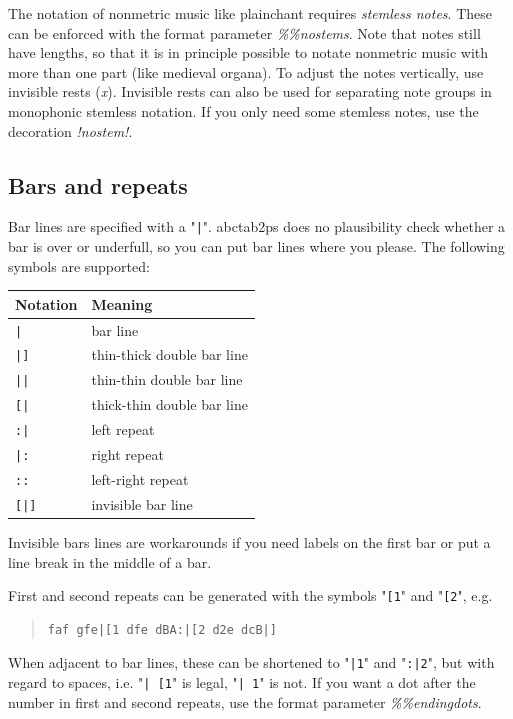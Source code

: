 \documentclass[a4paper]{article}
\begin{document}
 
The notation of nonmetric music like plainchant requires {\it stemless notes}.
These can be enforced with the format parameter {\it \%\%nostems}.
Note that notes still have lengths, so that it is in principle possible
to notate nonmetric music with more than one part (like medieval organa).
To adjust the notes vertically, use invisible rests ({\it x}). Invisible
rests can also be used for separating note groups in monophonic stemless
notation. If you only need some stemless notes, use the decoration
{\it !nostem!}.

\subsection{Bars and repeats}
  
Bar lines are specified with a "\verb$|$". abctab2ps does no 
plausibility check whether a bar is over or underfull, so you can 
put bar lines where you please. The following symbols are supported:

\begin{center}
\begin{tabular}{|l|l|} \hline
Notation & Meaning \\ \hline
 \verb$|$ & bar line \\ \hline
 \verb$|]$ & thin-thick double bar line \\ \hline
 \verb$||$ & thin-thin double bar line \\ \hline
 \verb$[|$ & thick-thin double bar line \\ \hline
 \verb$:|$ & left repeat \\ \hline
 \verb$|:$ & right repeat \\ \hline
 \verb$::$ & left-right repeat \\ \hline
 \verb$[|]$ & invisible bar line \\ \hline
\end{tabular}
\end{center}

Invisible bars lines are workarounds if you need labels on the
first bar or put a line break in the middle of a bar.

First and second repeats can be generated with the symbols "\verb$[1$" 
and "\verb$[2$",  e.g.
\begin{quote}
\begin{verbatim}
faf gfe|[1 dfe dBA:|[2 d2e dcB|]
\end{verbatim}
\end{quote}
When adjacent to bar lines, these can be shortened to 
"\verb$|1$" and "\verb$:|2$", but with  regard  to
spaces, i.e. "\verb$| [1$" is legal, "\verb$| 1$" is not.
If you want a dot after the number in first and second repeats, use
the format parameter {\it \%\%endingdots}.
\end{document}
